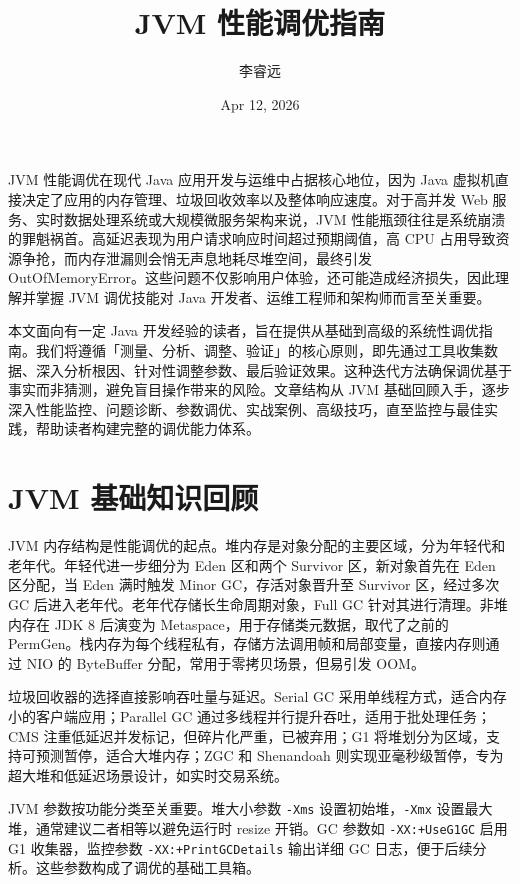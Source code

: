 \title{JVM 性能调优指南}
\author{李睿远}
\date{Apr 12, 2026}
\maketitle
JVM 性能调优在现代 Java 应用开发与运维中占据核心地位，因为 Java 虚拟机直接决定了应用的内存管理、垃圾回收效率以及整体响应速度。对于高并发 Web 服务、实时数据处理系统或大规模微服务架构来说，JVM 性能瓶颈往往是系统崩溃的罪魁祸首。高延迟表现为用户请求响应时间超过预期阈值，高 CPU 占用导致资源争抢，而内存泄漏则会悄无声息地耗尽堆空间，最终引发 OutOfMemoryError。这些问题不仅影响用户体验，还可能造成经济损失，因此理解并掌握 JVM 调优技能对 Java 开发者、运维工程师和架构师而言至关重要。\par
本文面向有一定 Java 开发经验的读者，旨在提供从基础到高级的系统性调优指南。我们将遵循「测量、分析、调整、验证」的核心原则，即先通过工具收集数据、深入分析根因、针对性调整参数、最后验证效果。这种迭代方法确保调优基于事实而非猜测，避免盲目操作带来的风险。文章结构从 JVM 基础回顾入手，逐步深入性能监控、问题诊断、参数调优、实战案例、高级技巧，直至监控与最佳实践，帮助读者构建完整的调优能力体系。\par
\chapter{JVM 基础知识回顾}
JVM 内存结构是性能调优的起点。堆内存是对象分配的主要区域，分为年轻代和老年代。年轻代进一步细分为 Eden 区和两个 Survivor 区，新对象首先在 Eden 区分配，当 Eden 满时触发 Minor GC，存活对象晋升至 Survivor 区，经过多次 GC 后进入老年代。老年代存储长生命周期对象，Full GC 针对其进行清理。非堆内存在 JDK 8 后演变为 Metaspace，用于存储类元数据，取代了之前的 PermGen。栈内存为每个线程私有，存储方法调用帧和局部变量，直接内存则通过 NIO 的 ByteBuffer 分配，常用于零拷贝场景，但易引发 OOM。\par
垃圾回收器的选择直接影响吞吐量与延迟。Serial GC 采用单线程方式，适合内存小的客户端应用；Parallel GC 通过多线程并行提升吞吐，适用于批处理任务；CMS 注重低延迟并发标记，但碎片化严重，已被弃用；G1 将堆划分为区域，支持可预测暂停，适合大堆内存；ZGC 和 Shenandoah 则实现亚毫秒级暂停，专为超大堆和低延迟场景设计，如实时交易系统。\par
JVM 参数按功能分类至关重要。堆大小参数 \texttt{-Xms} 设置初始堆，\texttt{-Xmx} 设置最大堆，通常建议二者相等以避免运行时 resize 开销。GC 参数如 \texttt{-XX:+UseG1GC} 启用 G1 收集器，监控参数 \texttt{-XX:+PrintGCDetails} 输出详细 GC 日志，便于后续分析。这些参数构成了调优的基础工具箱。\par
